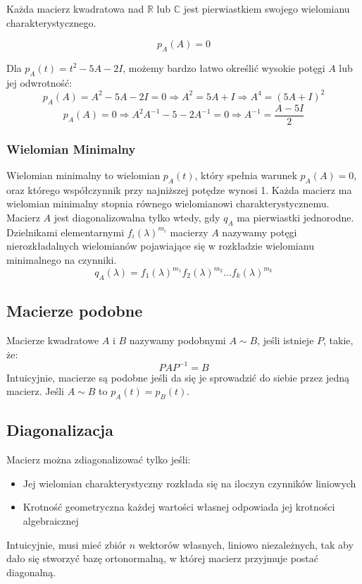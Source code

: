 \documentclass{../notatki}
\begin{document}
Każda macierz kwadratowa nad $\mathbb{R}$ lub $\mathbb{C}$ jest
pierwiastkiem swojego wielomianu charakterystycznego.

$$
p_A(A) = 0
$$

Dla $p_A(t) = t^2 - 5A - 2I$, możemy bardzo łatwo określić wysokie potęgi $A$
lub jej odwrotność:
$$
p_A(A) = A^2 - 5A - 2I = 0 \Rightarrow A^2 = 5A + I \Rightarrow A^4 = (5A + I)^2
$$
$$
p_A(A) = 0 \Rightarrow A^2A^{-1} -5 - 2A^{-1} = 0 \Rightarrow A^{-1}
= \frac{A - 5I}{2}
$$

\subsubsection{Wielomian Minimalny}

Wielomian minimalny to wielomian $p_A(t)$, który spełnia warunek
$p_A(A) = 0$, oraz którego współczynnik przy najniższej potędze wynosi 1.
Każda macierz ma wielomian minimalny stopnia równego wielomianowi
charakterystycznemu. Macierz $A$ jest diagonalizowalna tylko wtedy, gdy $q_A$
ma pierwiastki jednorodne. Dzielnikami elementarnymi $f_i(\lambda)^{m_i}$
macierzy $A$ nazywamy potęgi nierozkładalnych wielomianów pojawiające się w
rozkładzie wielomianu minimalnego na czynniki.
$$
q_A(\lambda) = f_1(\lambda)^{m_1} f_2(\lambda)^{m_2}\dots f_k(\lambda)^{m_k}
$$

\subsection{Macierze podobne}

Macierze kwadratowe $A$ i $B$ nazywamy podobnymi $A \sim B$, jeśli istnieje $P$,
takie, że:
$$
PAP^{-1} = B
$$
Intuicyjnie, macierze są podobne jeśli da się je sprowadzić do siebie przez
jedną macierz. Jeśli $A \sim B$ to $p_A(t) = p_B(t)$.

\subsection{Diagonalizacja}

Macierz można zdiagonalizować tylko jeśli:
\begin{itemize}
  \item Jej wielomian charakterystyczny rozkłada się na iloczyn
    czynników liniowych
  \item Krotność geometryczna każdej wartości własnej odpowiada jej
    krotności algebraicznej
\end{itemize}

Intuicyjnie, musi mieć zbiór $n$ wektorów własnych, liniowo niezależnych, tak
aby dało się stworzyć bazę ortonormalną, w której macierz przyjmuje
postać diagonalną.
\end{document}
